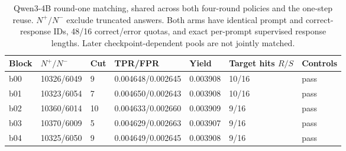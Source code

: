 \begin{table}[H]
\caption{Qwen3-4B round-one matching, shared across both four-round policies and the one-step reuse. $N^+/N^-$ exclude truncated answers. Both arms have identical prompt and correct-response IDs, 48/16 correct/error quotas, and exact per-prompt supervised response lengths. Later checkpoint-dependent pools are not jointly matched.}
\label{tab:qwen4b-matching}
\centering\small\setlength{\tabcolsep}{3pt}
\begin{tabular}{@{}lllllll@{}}
\toprule
Block & $N^+/N^-$ & Cut & TPR/FPR & Yield & Target hits $R/S$ & Controls\\
\midrule
b00 & 10326/6049 & 9 & 0.004648/0.002645 & 0.003908 & 10/16 & pass\\
b01 & 10323/6054 & 7 & 0.004650/0.002643 & 0.003908 & 10/16 & pass\\
b02 & 10360/6014 & 10 & 0.004633/0.002660 & 0.003909 & 9/16 & pass\\
b03 & 10370/6009 & 5 & 0.004629/0.002663 & 0.003907 & 9/16 & pass\\
b04 & 10325/6050 & 9 & 0.004649/0.002645 & 0.003908 & 9/16 & pass\\
\bottomrule
\end{tabular}
\end{table}
